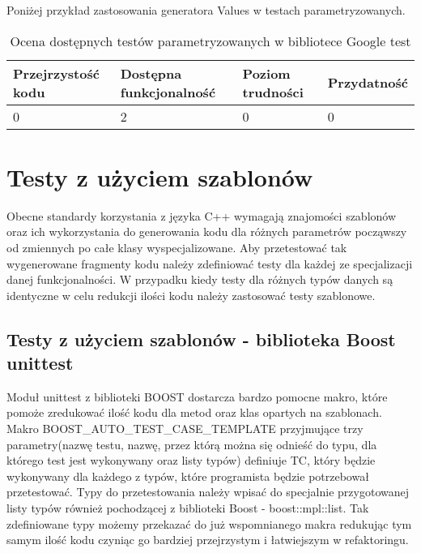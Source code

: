 \documentclass[12pt,a4paper,notitlepage]{report}
\begin{document}
Poniżej przykład zastosowania generatora Values w testach parametryzowanych.

			

\begin{center}
			\begin{table}[!ht]
			\caption{Ocena dostępnych testów parametryzowanych w bibliotece Google test}
			\label{}
			\begin{tabular}[!hc]{|l|l|l|l|}
		\hline
		Przejrzystość kodu 	&	Dostępna funkcjonalność	&	Poziom trudności	&	Przydatność \\ \hline
		0					&	2						&	0					& 	0  			\\ \hline
			\end{tabular}
			\end{table} 
		\end{center}

\section{Testy z użyciem szablonów}

Obecne standardy korzystania z języka C++ wymagają znajomości szablonów oraz ich wykorzystania do generowania kodu dla różnych parametrów począwszy od zmiennych po całe klasy wyspecjalizowane. Aby przetestować tak wygenerowane fragmenty kodu należy zdefiniować testy dla każdej ze specjalizacji danej funkcjonalności.
W przypadku kiedy testy dla różnych typów danych są identyczne w celu redukcji ilości kodu należy zastosować testy szablonowe.

\subsection{Testy z użyciem szablonów - biblioteka Boost unittest}

Moduł unittest z biblioteki BOOST dostarcza bardzo pomocne makro, które pomoże zredukować ilość kodu dla metod oraz klas opartych na szablonach. Makro BOOST{\_}AUTO{\_}TEST{\_}CASE{\_}TEMPLATE przyjmujące trzy parametry(nazwę testu, nazwę, przez którą można się odnieść do typu, dla którego test jest wykonywany oraz listy typów) definiuje TC, który będzie wykonywany dla każdego z typów, które programista będzie potrzebował przetestować.
Typy do przetestowania należy wpisać do specjalnie przygotowanej listy typów również pochodzącej z biblioteki Boost - boost::mpl::list. Tak zdefiniowane typy możemy przekazać do już wspomnianego makra redukując tym samym ilość kodu czyniąc go bardziej przejrzystym i łatwiejszym w refaktoringu.
\end{document}
